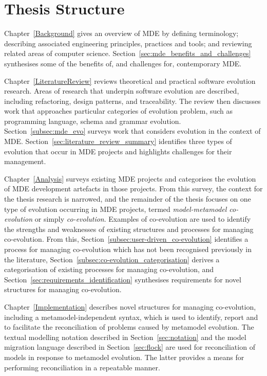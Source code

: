
\section{Thesis Structure}
Chapter~\ref{Background} gives an overview of MDE by defining terminology; describing associated engineering principles, practices and tools; and reviewing related areas of computer science. Section~\ref{sec:mde_benefits_and_challenges} synthesises some of the benefits of, and challenges for, contemporary MDE.

Chapter~\ref{LiteratureReview} reviews theoretical and practical software evolution research. Areas of research that underpin software evolution are described, including refactoring, design patterns, and traceability. The review then discusses work that approaches particular categories of evolution problem, such as programming language, schema and grammar evolution. Section~\ref{subsec:mde_evo} surveys work that considers evolution in the context of MDE. Section~\ref{sec:literature_review_summary} identifies three types of evolution that occur in MDE projects and highlights challenges for their management.

Chapter~\ref{Analysis} surveys existing MDE projects and categorises the evolution of MDE development artefacts in those projects. From this survey, the context for the thesis research is narrowed, and the remainder of the thesis focuses on one type of evolution occurring in MDE projects, termed \emph{model-metamodel co-evolution} or simply \emph{co-evolution}. Examples of co-evolution are used to identify the strengths and weaknesses of existing structures and processes for managing co-evolution. From this, Section~\ref{subsec:user-driven_co-evolution} identifies a process for managing co-evolution which has not been recognised previously in the literature, Section~\ref{subsec:co-evolution_categorisation} derives a categorisation of existing processes for managing co-evolution, and Section~\ref{sec:requirements_identification} synthesises requirements for novel structures for managing co-evolution.

Chapter~\ref{Implementation} describes novel structures for managing co-evolution, including a metamodel-independent syntax, which is used to identify, report and to facilitate the reconciliation of problems caused by metamodel evolution. The textual modelling notation described in Section~\ref{sec:notation} and the model migration language described in Section~\ref{sec:flock} are used for reconciliation of models in response to metamodel evolution. The latter provides a means for performing reconciliation in a repeatable manner.


